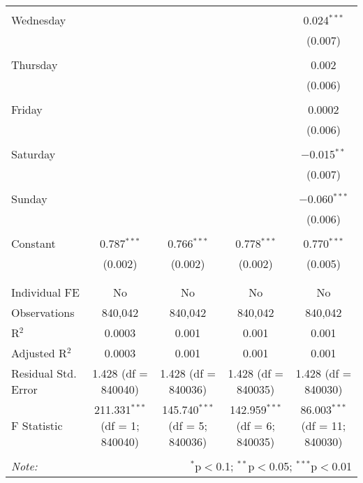 \documentclass[
]{article}
\begin{document}
\begin{table}[!htbp]
{\begin{tabular}{@{\extracolsep{5pt}}lcccc}
  & & & & \\ 
 Wednesday &  &  &  & 0.024$^{***}$ \\ 
  &  &  &  & (0.007) \\ 
  & & & & \\ 
 Thursday &  &  &  & 0.002 \\ 
  &  &  &  & (0.006) \\ 
  & & & & \\ 
 Friday &  &  &  & 0.0002 \\ 
  &  &  &  & (0.006) \\ 
  & & & & \\ 
 Saturday &  &  &  & $-$0.015$^{**}$ \\ 
  &  &  &  & (0.007) \\ 
  & & & & \\ 
 Sunday &  &  &  & $-$0.060$^{***}$ \\ 
  &  &  &  & (0.006) \\ 
  & & & & \\ 
 Constant & 0.787$^{***}$ & 0.766$^{***}$ & 0.778$^{***}$ & 0.770$^{***}$ \\ 
  & (0.002) & (0.002) & (0.002) & (0.005) \\ 
  & & & & \\ 
\hline \\[-1.8ex] 
Individual FE & No & No & No & No \\ 
Observations & 840,042 & 840,042 & 840,042 & 840,042 \\ 
R$^{2}$ & 0.0003 & 0.001 & 0.001 & 0.001 \\ 
Adjusted R$^{2}$ & 0.0003 & 0.001 & 0.001 & 0.001 \\ 
Residual Std. Error & 1.428 (df = 840040) & 1.428 (df = 840036) & 1.428 (df = 840035) & 1.428 (df = 840030) \\ 
F Statistic & 211.331$^{***}$ (df = 1; 840040) & 145.740$^{***}$ (df = 5; 840036) & 142.959$^{***}$ (df = 6; 840035) & 86.003$^{***}$ (df = 11; 840030) \\ 
\hline 
\hline \\[-1.8ex] 
\textit{Note:}  & \multicolumn{4}{r}{$^{*}$p$<$0.1; $^{**}$p$<$0.05; $^{***}$p$<$0.01} \\ 
\end{tabular}
} 
\end{table} 
\newpage
\end{document}
